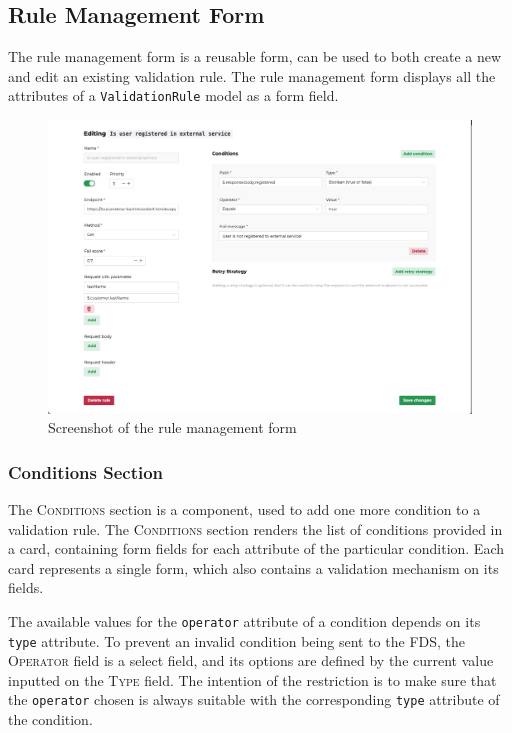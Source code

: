   \subsection{Rule Management Form}
  
    The rule management form is a reusable form, can be used to both create a new and edit an existing validation rule. The rule management form displays all the attributes of a \verb;ValidationRule; model as a form field. 

    \begin{figure}[!ht]
      \includegraphics[width=\textwidth]{images/ss_sample_filled.jpeg}
      \caption{Screenshot of the rule management form}
    \end{figure}

    \subsubsection{Conditions Section}

      The \textsc{Conditions} section is a component, used to add one more condition to a validation rule. The \textsc{Conditions} section renders the list of conditions provided in a card, containing form fields for each attribute of the particular condition. Each card represents a single form, which also contains a validation mechanism on its fields. 
      
      The available values for the \verb;operator; attribute of a condition depends on its \verb;type; attribute. To prevent an invalid condition being sent to the FDS, the \textsc{Operator} field is a select field, and its options are defined by the current value inputted on the \textsc{Type} field. The intention of the restriction is to make sure that the \verb;operator; chosen is always suitable with the corresponding \verb;type; attribute of the condition.

